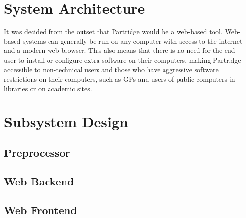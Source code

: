 %
%

\section{ System Architecture}

It was decided from the outset that Partridge would be a web-based tool.
Web-based systems can generally be run on any computer with access to the
internet and a modern web browser. This also means that there is no need for
the end user to install or configure extra software on their computers, making
Partridge accessible to non-technical users and those who have aggressive
software restrictions on their computers, such as GPs and users of public
computers in libraries or on academic sites.



\section{ Subsystem Design }

\subsection{ Preprocessor }

\subsection{ Web Backend }

\subsection{ Web Frontend }
